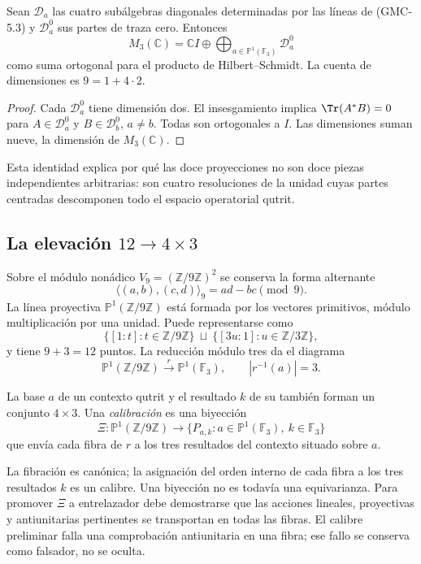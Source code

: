 \begin{proposition}
\label{p12-83-c22-s8:gmc:prop:descomposicion-masa-qutrit}
Sean $\mathcal D_a$ las cuatro subálgebras diagonales determinadas por las
líneas de \textup{(GMC-5.3)} y $\mathcal D_a^0$ sus partes de traza cero. Entonces
\[
 M_3(\mathbb C)
 =\mathbb CI\oplus
   \bigoplus_{a\in\mathbb P^1(\mathbb F_3)}\mathcal D_a^0
 \tag{GMC-5.4}
\]
como suma ortogonal para el producto de Hilbert--Schmidt. La cuenta de
dimensiones es $9=1+4\cdot2$.
\end{proposition}

\begin{proof}
Cada $\mathcal D_a^0$ tiene dimensión dos. El insesgamiento implica
$\Tr(A^*B)=0$ para $A\in\mathcal D_a^0$ y
$B\in\mathcal D_b^0$, $a\ne b$. Todas son ortogonales a $I$. Las
dimensiones suman nueve, la dimensión de $M_3(\mathbb C)$.
\end{proof}

Esta identidad explica por qué las doce proyecciones no son doce piezas
independientes arbitrarias: son cuatro resoluciones de la unidad cuyas partes
centradas descomponen todo el espacio operatorial qutrit.

\subsection{La elevación \texorpdfstring{$12\to4\times3$}{12 a 4 por 3}}

Sobre el módulo nonádico $V_9=(\mathbb Z/9\mathbb Z)^2$ se conserva la forma
alternante
\[
 \langle(a,b),(c,d)\rangle_9=ad-bc\pmod9.
 \tag{GMC-5.5}
\]
La línea proyectiva $\mathbb P^1(\mathbb Z/9\mathbb Z)$ está formada por
los vectores primitivos, módulo multiplicación por una unidad. Puede
representarse como
\[
 \{[1:t]:t\in\mathbb Z/9\mathbb Z\}
 \ \sqcup\ 
 \{[3u:1]:u\in\mathbb Z/3\mathbb Z\},
 \tag{GMC-5.6}
\]
y tiene $9+3=12$ puntos. La reducción módulo tres da el diagrama
\[
 \mathbb P^1(\mathbb Z/9\mathbb Z)
 \xrightarrow{\ r\ }
 \mathbb P^1(\mathbb F_3),
 \qquad |r^{-1}(a)|=3.
 \tag{GMC-5.7}
\]

La base $a$ de un contexto qutrit y el resultado $k$ de su \PVM también
forman un conjunto $4\times3$. Una \emph{calibración} es una biyección
\[
 \Xi:\mathbb P^1(\mathbb Z/9\mathbb Z)
 \longrightarrow
 \{P_{a,k}:a\in\mathbb P^1(\mathbb F_3),\ k\in\mathbb F_3\}
 \tag{GMC-5.8}
\]
que envía cada fibra de $r$ a los tres resultados del contexto situado sobre
$a$.

\begin{controlbox}
La fibración es canónica; la asignación del orden interno de cada fibra a los
tres resultados $k$ es un calibre. Una biyección no es todavía una
equivarianza. Para promover $\Xi$ a entrelazador debe demostrarse que las
acciones lineales, proyectivas y antiunitarias pertinentes se transportan en
todas las fibras. El calibre preliminar falla una comprobación antiunitaria en una
fibra; ese fallo se conserva como falsador, no se oculta.
\end{controlbox}

